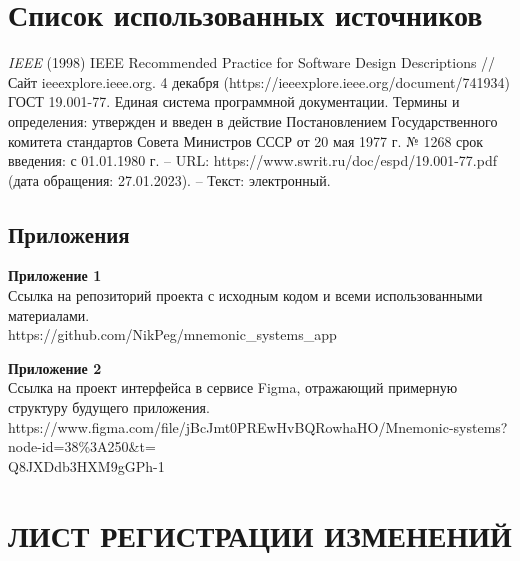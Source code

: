 \documentclass[draft]{article}
\newcommand\zz[1]{\par{\normalsize\strut #1} \hfill\ignorespaces}
\begin{document}
\section*{Список использованных источников}
\begin{thebibliography}{}
 \textit{IEEE} (1998) IEEE Recommended Practice for Software Design Descriptions // Сайт ieeexplore.ieee.org. 4 декабря (https://ieeexplore.ieee.org/document/741934)
 ГОСТ 19.001-77. Единая система программной документации. Термины и определения: утвержден и введен в действие Постановлением Государственного комитета стандартов Совета Министров СССР от 20 мая 1977 г. № 1268 срок введения: с 01.01.1980 г. – URL: https://www.swrit.ru/doc/espd/19.001-77.pdf (дата обращения: 27.01.2023). – Текст: электронный.
\end{thebibliography}
\newpage
\begin{center}
\section*{Приложения}
\end{center}
\zz{}\textbf{Приложение 1\\}
Ссылка на репозиторий проекта с исходным кодом и всеми использованными материалами.\\
https://github.com/NikPeg/mnemonic\_systems\_app\\
\zz{}\textbf{Приложение 2\\}
Ссылка на проект интерфейса в сервисе Figma, отражающий примерную структуру будущего приложения.\\
https://www.figma.com/file/jBcJmt0PREwHvBQRowhaHO/Mnemonic-systems?node-id=38\%3A250\&t=\\
Q8JXDdb3HXM9gGPh-1\\
\newpage
\section*{ЛИСТ РЕГИСТРАЦИИ ИЗМЕНЕНИЙ}
\end{document}
